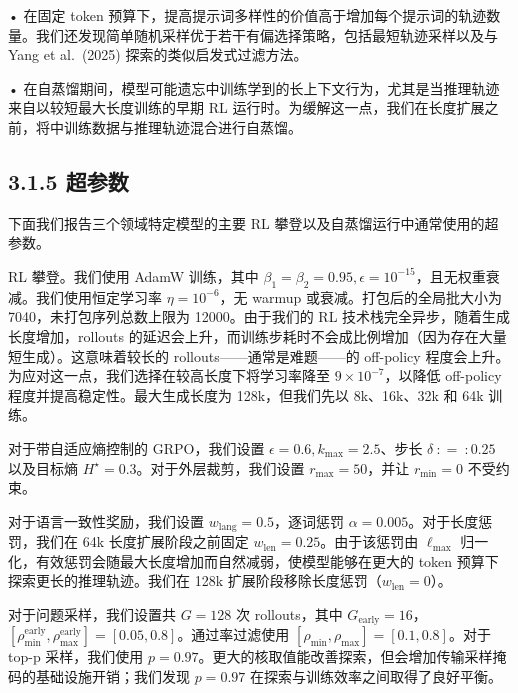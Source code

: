 • 在固定 token 预算下，提高提示词多样性的价值高于增加每个提示词的轨迹数量。我们还发现简单随机采样优于若干有偏选择策略，包括最短轨迹采样以及与 Yang et al.~(2025) 探索的类似启发式过滤方法。

• 在自蒸馏期间，模型可能遗忘中训练学到的长上下文行为，尤其是当推理轨迹来自以较短最大长度训练的早期 RL 运行时。为缓解这一点，我们在长度扩展之前，将中训练数据与推理轨迹混合进行自蒸馏。

\subsection{3.1.5 超参数}\label{hyperparameters-1}

下面我们报告三个领域特定模型的主要 RL 攀登以及自蒸馏运行中通常使用的超参数。

RL 攀登。我们使用 AdamW 训练，其中 \(\beta _ { 1 } = \beta _ { 2 } = 0 . 9 5 , \epsilon = 1 0 ^ { - 1 5 }\)，且无权重衰减。我们使用恒定学习率 \(\eta = 1 0 ^ { - 6 }\)，无 warmup 或衰减。打包后的全局批大小为 7040，未打包序列总数上限为 12000。由于我们的 RL 技术栈完全异步，随着生成长度增加，rollouts 的延迟会上升，而训练步耗时不会成比例增加（因为存在大量短生成）。这意味着较长的 rollouts——通常是难题——的 off-policy 程度会上升。为应对这一点，我们选择在较高长度下将学习率降至 $9 \times 1 0 ^ { - 7 }$，以降低 off-policy 程度并提高稳定性。最大生成长度为 128k，但我们先以 8k、16k、32k 和 64k 训练。

对于带自适应熵控制的 GRPO，我们设置 \(\epsilon = 0 . 6 , k _ { \mathrm { m a x } } = 2 . 5\)、步长 \(\delta \ : = \ : 0 . 2 5\) 以及目标熵 \(H ^ { \star } = 0 . 3\)。对于外层裁剪，我们设置 \(r _ { \operatorname* { m a x } } = 5 0\)，并让 \(r _ { \operatorname* { m i n } } = 0\) 不受约束。

对于语言一致性奖励，我们设置 \(w _ { \mathrm { l a n g } } = 0 . 5\)，逐词惩罚 \(\alpha = 0 . 0 0 5\)。对于长度惩罚，我们在 64k 长度扩展阶段之前固定 \(w _ { \mathrm { l e n } } = 0 . 2 5\)。由于该惩罚由 \(\ell _ { \mathrm { m a x } }\) 归一化，有效惩罚会随最大长度增加而自然减弱，使模型能够在更大的 token 预算下探索更长的推理轨迹。我们在 128k 扩展阶段移除长度惩罚（\(w _ { \mathrm { l e n } } = 0\)）。

对于问题采样，我们设置共 \(G = 1 2 8\) 次 rollouts，其中 \(G _ { \mathrm { e a r l y } } = 1 6\)，\([ \rho _ { \mathrm { m i n } } ^ { \mathrm { e a r l y } } , \rho _ { \mathrm { m a x } } ^ { \mathrm { e a r l y } } ] = [ 0 . 0 5 , 0 . 8 ]\)。通过率过滤使用 \([ \rho _ { \operatorname* { m i n } } , \rho _ { \operatorname* { m a x } } ] = [ 0 . 1 , 0 . 8 ]\)。对于 top-p 采样，我们使用 $p = 0 . 9 7$。更大的核取值能改善探索，但会增加传输采样掩码的基础设施开销；我们发现 $p = 0 . 9 7$ 在探索与训练效率之间取得了良好平衡。

